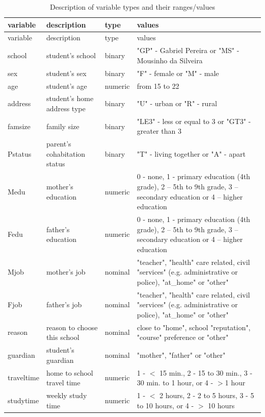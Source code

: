 \documentclass[12pt, a4paper]{article}\usepackage[]{graphicx}\usepackage[]{xcolor}
\begin{document}
\begin{longtable}[c]{l | p{5cm} | l | p{7cm}} 
\caption{Description of variable types and their ranges/values \label{t:variables}}\\

variable & description & type & values \\
\hline\hline
\endfirsthead

variable & description & type & values \\
\hline\hline
\endhead

school & student's school & binary & "GP" - Gabriel Pereira or "MS" - Mousinho da Silveira\\
sex & student's sex & binary & "F" - female or "M" - male\\
age & student's age & numeric & from 15 to 22 \\
address & student's home address type & binary & "U" - urban or "R" - rural\\
famsize & family size & binary & "LE3" - less or equal to 3 or "GT3" - greater than 3\\
Pstatus & parent's cohabitation status & binary & "T" - living together or "A" - apart\\
Medu & mother's education & numeric & 0 - none,  1 - primary education (4th grade), 2 – 5th to 9th grade, 3 – secondary education or 4 – higher education\\
Fedu & father's education & numeric & 0 - none,  1 - primary education (4th grade), 2 – 5th to 9th grade, 3 – secondary education or 4 – higher education\\
Mjob & mother's job & nominal & "teacher", "health" care related, civil "services" (e.g. administrative or police), "at\_home" or "other"\\
Fjob & father's job & nominal & "teacher", "health" care related, civil "services" (e.g. administrative or police), "at\_home" or "other"\\
reason & reason to choose this school & nominal & close to "home", school "reputation", "course" preference or "other"\\
guardian & student's guardian & nominal & "mother", "father" or "other"\\
traveltime & home to school travel time & numeric & 1 - $<$ 15 min., 2 - 15 to 30 min., 3 - 30 min. to 1 hour, or 4 - $>$1 hour\\
studytime & weekly study time & numeric & 1 - $<$ 2 hours, 2 - 2 to 5 hours, 3 - 5 to 10 hours, or 4 - $>$ 10 hours\\

\end{longtable}
\end{document}
